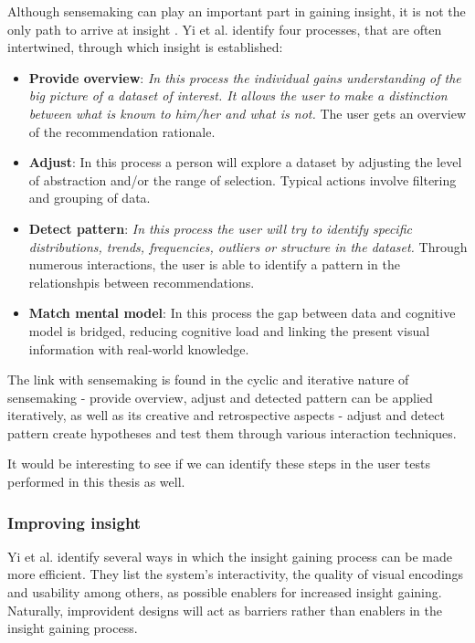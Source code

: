 Although sensemaking can play an important part in gaining insight, it is not the only path to arrive at insight \cite{yi:2008}. Yi et al. \cite{yi:2008} identify four processes, that are often intertwined, through which insight is established:

\begin{itemize}
	\item \textbf{Provide overview}: \textit{In this process the individual gains understanding of the big picture of a dataset of interest. It allows the user to make a distinction between what is known to him/her and what is not.} The user gets an overview of the recommendation rationale.
	\item \textbf{Adjust}: In this process a person will explore a dataset by adjusting the level of abstraction and/or the range of selection. Typical actions involve filtering and grouping of data.
	\item \textbf{Detect pattern}: \textit{In this process the user will try to identify specific distributions, trends, frequencies, outliers or structure in the dataset.} Through numerous interactions, the user is able to identify a pattern in the relationshpis between recommendations.
	\item \textbf{Match mental model}: In this process the gap between data and cognitive model is bridged, reducing cognitive load and linking the present visual information with real-world knowledge.
\end{itemize}

The link with sensemaking is found in the cyclic and iterative nature of sensemaking - provide overview, adjust and detected pattern can be applied iteratively, as well as its creative and retrospective aspects - adjust and detect pattern create hypotheses and test them through various interaction techniques\cite{yi:2008}.

It would be interesting to see if we can identify these steps in the user tests performed in this thesis as well.


\subsubsection{Improving insight}\label{chapter:literature_study:section:user:subsection:insight:subsubsection:improving}


Yi et al. \cite{yi:2008} identify several ways in which the insight gaining process can be made more efficient. They list the system's interactivity, the quality of visual encodings and usability among others, as possible enablers for increased insight gaining. Naturally, improvident designs will act as barriers rather than enablers in the insight gaining process.


